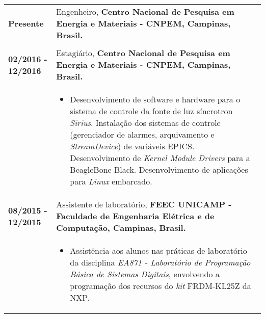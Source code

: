 \documentclass[10pt, a4paper]{article}
\begin{document}
\begin{tabular}{p{} p{}}


\textbf{Presente}  & Engenheiro, \textbf{Centro Nacional de Pesquisa
em Energia e Materiais - CNPEM, Campinas, Brasil.}
\\
& \vspace{-12pt}
%
\\

\textbf{02/2016 - 12/2016}  & Estagiário, \textbf{Centro Nacional de Pesquisa em
Energia e Materiais - CNPEM, Campinas, Brasil.}
\\
& \vspace{-12pt}
\begin{itemize}
  \item Desenvolvimento de software e hardware para o sistema de controle da
  fonte de luz síncrotron \textit{Sirius}. Instalação dos sistemas de
  controle (gerenciador de alarmes, arquivamento e \textit{StreamDevice}) de variáveis EPICS. Desenvolvimento de
  \textit{Kernel Module Drivers} para a BeagleBone Black. Desenvolvimento
  de aplicações para \textit{Linux} embarcado.
  
\end{itemize}\\


\textbf{08/2015 - 12/2015}  & Assistente de laboratório, \textbf{FEEC
UNICAMP - Faculdade de Engenharia Elétrica e de Computação, Campinas, Brasil.}
\\
& \vspace{-12pt}
\begin{itemize}
  \item Assistência aos alunos nas práticas de laboratório da
  disciplina \textit{EA871 - Laboratório de Programação Básica de Sistemas
  Digitais}, envolvendo a programação dos recursos do \textit{kit} FRDM-KL25Z
  da NXP.
  
\end{itemize}\\


\end{tabular}
\end{document}
